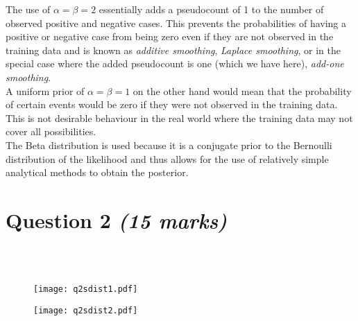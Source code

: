 \documentclass[paper=a4, fontsize=11pt]{scrartcl} %
\numberwithin{equation}{section} %
\numberwithin{figure}{section} %
\numberwithin{table}{section} %
\begin{document}
The use of $\alpha=\beta=2$ essentially adds a pseudocount of 1 to the number of observed positive and negative cases. This prevents the probabilities of having a positive or negative case from being zero even if they are not observed in the training data and is known as \textit{additive smoothing}, \textit{Laplace smoothing}, or in the special case where the added pseudocount is one (which we have here), \textit{add-one smoothing}.\\

A uniform prior of $\alpha=\beta=1$ on the other hand would mean that the probability of certain events would be zero if they were not observed in the training data. This is not desirable behaviour in the real world where the training data may not cover all possibilities. \\

The Beta distribution is used because it is a conjugate prior to the Bernoulli distribution of the likelihood and thus allows for the use of relatively simple analytical methods to obtain the posterior.\\







\newpage
\section{\textbf{Question 2 \textit{(15 marks)}}}

\\
\\

\begin{figure}[!h]
\centering
\texttt{[image: q2sdist1.pdf]}%
\end{figure}

\begin{figure}[!h]
\centering
\texttt{[image: q2sdist2.pdf]}%
\end{figure}
\end{document}
